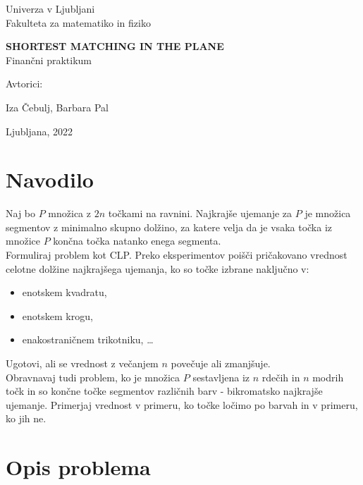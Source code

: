 \documentclass[a4paper, 11pt]{article}
\begin{document}
\thispagestyle{empty}
\begin{center}
\begin{minipage}{0.75\linewidth}
    \centering
    {\Large Univerza v Ljubljani \\ Fakulteta za matematiko in fiziko}
    \\
    \vspace{7cm}

    {\uppercase{\Large \textbf{Shortest matching in the plane}}} \\ Finančni praktikum \\
    \vspace{3cm}

    Avtorici:\\
    {\Large Iza Čebulj, Barbara Pal\par}
    \vspace{7cm}

    {\Large Ljubljana, 2022}
\end{minipage}
\end{center}

\newpage
 
\section{Navodilo}

Naj bo $P$ množica z $2n$ točkami na ravnini. Najkrajše ujemanje za $P$ je množica segmentov z minimalno skupno dolžino, za katere velja da je vsaka točka iz množice $P$ končna točka natanko enega segmenta. \\
Formuliraj problem kot CLP. Preko eksperimentov poišči pričakovano vrednost celotne dolžine najkrajšega ujemanja, ko so točke izbrane naključno v:
\begin{itemize}
    \item enotskem kvadratu,
    \item enotskem krogu,
    \item enakostraničnem trikotniku, \dots
\end{itemize}
Ugotovi, ali se vrednost z večanjem $n$ povečuje ali zmanjšuje. \\
Obravnavaj tudi problem, ko je množica $P$ sestavljena iz $n$ rdečih in $n$ modrih točk in so končne točke segmentov različnih barv - bikromatsko najkrajše ujemanje. 
Primerjaj vrednost v primeru, ko točke ločimo po barvah in v primeru, ko jih ne.  

\section{Opis problema}
\end{document}
